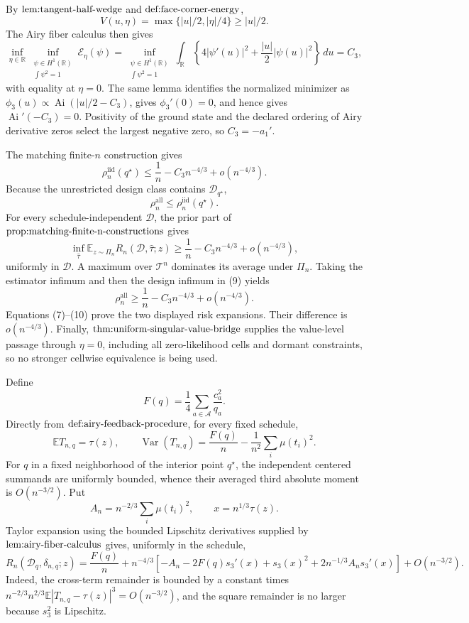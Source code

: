 By \(\textnormal{lem:tangent-half-wedge}\) and \(\textnormal{def:face-corner-energy}\),
\[
V(u,\eta)=\max\{|u|/2,|\eta|/4\}\geq |u|/2.
\]
The Airy fiber calculus then gives
\[
\inf_{\eta\in\mathbb R}\inf_{\substack{\psi\in H^1(\mathbb R)\\ \int\psi^2=1}}
\mathcal E_\eta(\psi)
=\inf_{\substack{\psi\in H^1(\mathbb R)\\ \int\psi^2=1}}
\int_{\mathbb R}\left\{4|\psi'(u)|^2+\frac{|u|}{2}|\psi(u)|^2\right\}\,du
=C_3,
\]
with equality at \(\eta=0\).  The same lemma identifies the normalized minimizer as \(\phi_3(u)\propto\operatorname{Ai}(|u|/2-C_3)\), gives \(\phi_3'(0)=0\), and hence gives \(\operatorname{Ai}'(-C_3)=0\).  Positivity of the ground state and the declared ordering of Airy derivative zeros select the largest negative zero, so \(C_3=-a_1'\).

The matching finite-\(n\) construction gives
\[
\rho_n^{\mathrm{iid}}(q^\star)
\leq \frac1n-C_3n^{-4/3}+o(n^{-4/3}).
\tag{7}
\]
Because the unrestricted design class contains \(\mathcal D_{q^\star}\),
\[
\rho_n^{\mathrm{all}}\leq\rho_n^{\mathrm{iid}}(q^\star).
\tag{8}
\]
For every schedule-independent \(\mathcal D\), the prior part of \(\textnormal{prop:matching-finite-n-constructions}\) gives
\[
\inf_{\widehat\tau}\mathbb E_{z\sim\Pi_n}
R_n(\mathcal D,\widehat\tau;z)
\geq \frac1n-C_3n^{-4/3}+o(n^{-4/3}),
\tag{9}
\]
uniformly in \(\mathcal D\).  A maximum over \(\mathcal T^n\) dominates its average under \(\Pi_n\).  Taking the estimator infimum and then the design infimum in (9) yields
\[
\rho_n^{\mathrm{all}}
\geq \frac1n-C_3n^{-4/3}+o(n^{-4/3}).
\tag{10}
\]
Equations (7)--(10) prove the two displayed risk expansions.  Their difference is \(o(n^{-4/3})\).  Finally, \(\textnormal{thm:uniform-singular-value-bridge}\) supplies the value-level passage through \(\eta=0\), including all zero-likelihood cells and dormant constraints, so no stronger cellwise equivalence is being used.

Define
\[
F(q)=\frac14\sum_{a\in\mathcal A}\frac{c_a^2}{q_a}.
\]
Directly from \(\textnormal{def:airy-feedback-procedure}\), for every fixed schedule,
\[
\mathbb ET_{n,q}=\tau(z),
\qquad
\operatorname{Var}(T_{n,q})
=\frac{F(q)}n-\frac1{n^2}\sum_i\mu(t_i)^2.
\tag{11}
\]
For \(q\) in a fixed neighborhood of the interior point \(q^\star\), the independent centered summands are uniformly bounded, whence their averaged third absolute moment is \(O(n^{-3/2})\).  Put
\[
A_n=n^{-2/3}\sum_i\mu(t_i)^2,
\qquad x=n^{1/3}\tau(z).
\]
Taylor expansion using the bounded Lipschitz derivatives supplied by \(\textnormal{lem:airy-fiber-calculus}\) gives, uniformly in the schedule,
\[
R_n(\mathcal D_q,\delta_{n,q};z)
=\frac{F(q)}n+n^{-4/3}
\left[-A_n-2F(q)s_3'(x)+s_3(x)^2
+2n^{-1/3}A_ns_3'(x)\right]+O(n^{-3/2}).
\tag{12}
\]
Indeed, the cross-term remainder is bounded by a constant times \(n^{-2/3}n^{2/3}\mathbb E|T_{n,q}-\tau(z)|^3=O(n^{-3/2})\), and the square remainder is no larger because \(s_3^2\) is Lipschitz.

